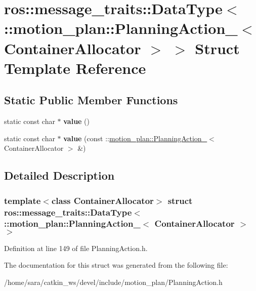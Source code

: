 \hypertarget{structros_1_1message__traits_1_1DataType_3_01_1_1motion__plan_1_1PlanningAction___3_01ContainerAllocator_01_4_01_4}{}\section{ros\+:\+:message\+\_\+traits\+:\+:Data\+Type$<$ \+:\+:motion\+\_\+plan\+:\+:Planning\+Action\+\_\+$<$ Container\+Allocator $>$ $>$ Struct Template Reference}
\label{structros_1_1message__traits_1_1DataType_3_01_1_1motion__plan_1_1PlanningAction___3_01ContainerAllocator_01_4_01_4}
\subsection*{Static Public Member Functions}
\begin{DoxyCompactItemize}
\item 
\mbox{\label{structros_1_1message__traits_1_1DataType_3_01_1_1motion__plan_1_1PlanningAction___3_01ContainerAllocator_01_4_01_4_a5afa4922648e5148de11adbefcf62e8c}} 
static const char $\ast$ {\bfseries value} ()
\item 
\mbox{\label{structros_1_1message__traits_1_1DataType_3_01_1_1motion__plan_1_1PlanningAction___3_01ContainerAllocator_01_4_01_4_a2dd2cac5a7414a57b1cf38ddebd81891}} 
static const char $\ast$ {\bfseries value} (const \+::\hyperlink{structmotion__plan_1_1PlanningAction__}{motion\+\_\+plan\+::\+Planning\+Action\+\_\+}$<$ Container\+Allocator $>$ \&)
\end{DoxyCompactItemize}


\subsection{Detailed Description}
\subsubsection*{template$<$class Container\+Allocator$>$\newline
struct ros\+::message\+\_\+traits\+::\+Data\+Type$<$ \+::motion\+\_\+plan\+::\+Planning\+Action\+\_\+$<$ Container\+Allocator $>$ $>$}



Definition at line 149 of file Planning\+Action.\+h.



The documentation for this struct was generated from the following file\+:\begin{DoxyCompactItemize}
\item 
/home/sara/catkin\+\_\+ws/devel/include/motion\+\_\+plan/Planning\+Action.\+h\end{DoxyCompactItemize}
